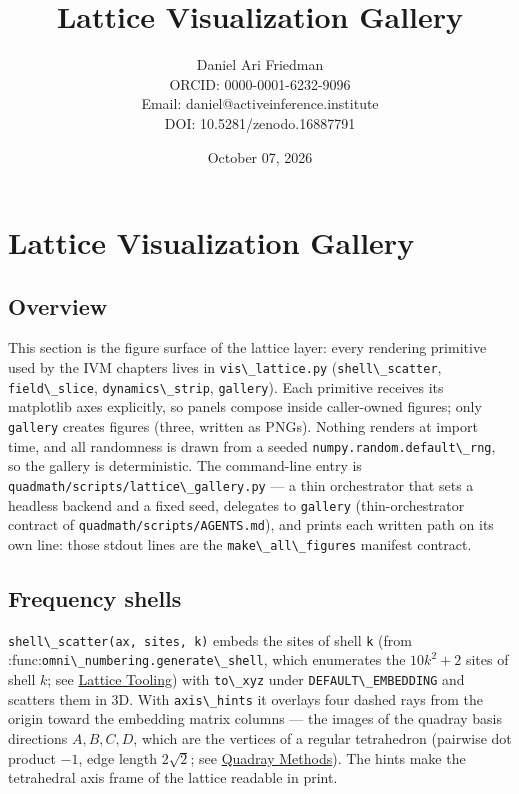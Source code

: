 \documentclass[
  10pt,
]{article}
\title{Lattice Visualization Gallery}
\author{Daniel Ari Friedman\\ ORCID: 0000-0001-6232-9096\\ Email: daniel@activeinference.institute\\ DOI: 10.5281/zenodo.16887791}
\date{October 07, 2026}
\newcommand{\passthrough}[1]{#1}
\begin{document}
\maketitle

{
\hypersetup{linkcolor=black}
\setcounter{tocdepth}{3}
\tableofcontents
}
\section{Lattice Visualization
Gallery}\label{lattice-visualization-gallery}

\subsection{Overview}\label{overview}

This section is the figure surface of the lattice layer: every rendering
primitive used by the IVM chapters lives in
\passthrough{\lstinline!vis\_lattice.py!}
(\passthrough{\lstinline!shell\_scatter!},
\passthrough{\lstinline!field\_slice!},
\passthrough{\lstinline!dynamics\_strip!},
\passthrough{\lstinline!gallery!}). Each primitive receives its
matplotlib axes explicitly, so panels compose inside caller-owned
figures; only \passthrough{\lstinline!gallery!} creates figures (three,
written as PNGs). Nothing renders at import time, and all randomness is
drawn from a seeded \passthrough{\lstinline!numpy.random.default\_rng!},
so the gallery is deterministic. The command-line entry is
\passthrough{\lstinline!quadmath/scripts/lattice\_gallery.py!} --- a
thin orchestrator that sets a headless backend and a fixed seed,
delegates to \passthrough{\lstinline!gallery!} (thin-orchestrator
contract of \passthrough{\lstinline!quadmath/scripts/AGENTS.md!}), and
prints each written path on its own line: those stdout lines are the
\passthrough{\lstinline!make\_all\_figures!} manifest contract.

\subsection{Frequency shells}\label{frequency-shells}

\passthrough{\lstinline!shell\_scatter(ax, sites, k)!} embeds the sites
of shell \passthrough{\lstinline!k!} (from
:func:\passthrough{\lstinline!omni\_numbering.generate\_shell!}, which
enumerates the \(10k^2 + 2\) sites of shell \(k\); see
\href{13_lattice_tooling.md}{Lattice Tooling}) with
\passthrough{\lstinline!to\_xyz!} under
\passthrough{\lstinline!DEFAULT\_EMBEDDING!} and scatters them in 3D.
With \passthrough{\lstinline!axis\_hints!} it overlays four dashed rays
from the origin toward the embedding matrix columns --- the images of
the quadray basis directions \(A, B, C, D\), which are the vertices of a
regular tetrahedron (pairwise dot product \(-1\), edge length
\(2\sqrt{2}\); see \href{03_quadray_methods.md}{Quadray Methods}). The
hints make the tetrahedral axis frame of the lattice readable in print.
\end{document}
